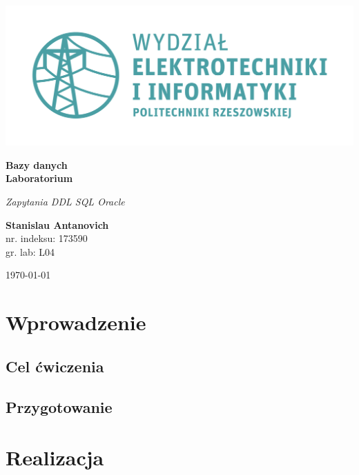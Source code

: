 \documentclass{article}
\begin{document}
\begin{titlepage}
\begin{center}
	\includegraphics[scale=0.7]{logo.png}

	\vspace*{4cm}
	\textbf{Bazy danych\\ Laboratorium}

	\vspace{1.5cm}
	\textit{Zapytania DDL SQL Oracle}

	\vspace{1.5cm}
	\textbf{Stanislau Antanovich}\\
	nr. indeksu: 173590\\
	gr. lab: L04

	\vspace{4.5cm}
	\today
\end{center}
\end{titlepage}

\tableofcontents
\listoffigures
\lstlistoflistings

\newpage
 
\section{Wprowadzenie}

\subsection{Cel ćwiczenia}

\blindtext
\subsection{Przygotowanie}

\blindtext

\section{Realizacja}
\end{document}
